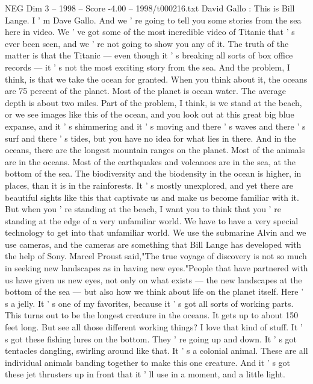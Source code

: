\begin{textsample}{NEG Dim 3 – 1998 – Score -4.00 – 1998/t000216.txt}  \label{ex:f3_neg_003}
David Gallo : This is Bill Lange.
I ' m Dave Gallo.
And we ' re going to tell you some stories from the sea here in video.
We ' ve got some of the most incredible video of Titanic that ' s ever been seen, and we ' re not going to show you any of it.
The truth of the matter is that the Titanic — even though it ' s breaking all sorts of box office records — it ' s not the most exciting story from the sea.
And the problem, I think, is that we take the ocean for granted.
When you think about it, the oceans are 75 percent of the planet.
Most of the planet is ocean water.
The average depth is about two miles.
Part of the problem, I think, is we stand at the beach, or we see images like this of the ocean, and you look out at this great big blue expanse, and it ' s shimmering and it ' s moving and there ' s waves and there ' s surf and there ' s tides, but you have no idea for what lies in there.
And in the oceans, there are the longest mountain ranges on the planet.
Most of the animals are in the oceans.
Most of the earthquakes and volcanoes are in the sea, at the bottom of the sea.
The biodiversity and the biodensity in the ocean is higher, in places, than it is in the rainforests.
It ' s mostly unexplored, and yet there are beautiful sights like this that captivate us and make us become familiar with it.
But when you ' re standing at the beach, I want you to think that you ' re standing at the edge of a very unfamiliar world.
We have to have a very special technology to get into that unfamiliar world.
We use the submarine Alvin and we use cameras, and the cameras are something that Bill Lange has developed with the help of Sony.
Marcel Proust said,"The true voyage of discovery is not so much in seeking new landscapes as in having new eyes."People that have partnered with us have given us new eyes, not only on what exists — the new landscapes at the bottom of the sea — but also how we think about life on the planet itself.
Here ' s a jelly.
It ' s one of my favorites, because it ' s got all sorts of working parts.
This turns out to be the longest creature in the oceans.
It gets up to about 150 feet long.
But see all those different working things?
I love that kind of stuff.
It ' s got these fishing lures on the bottom.
They ' re going up and down.
It ' s got tentacles dangling, swirling around like that.
It ' s a colonial animal.
These are all individual animals banding together to make this one creature.
And it ' s got these jet thrusters up in front that it ' ll use in a moment, and a little light.

\end{textsample}
